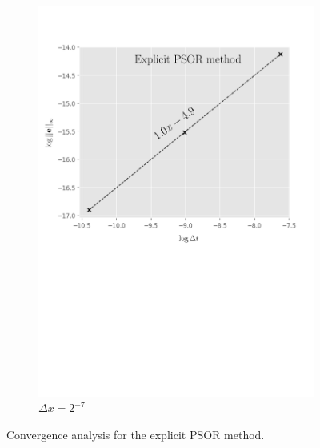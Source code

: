 \begin{figure}[H]
\begin{subfigure}{0.4\textwidth}
    \includegraphics[width=\textwidth]{chapters/chapter5/ConvergenceTimeExplicitLCP.pdf}
    \caption{$\Delta{t}=2^{-15},2^{-17},\dots,2^{-21}$}
    \caption*{$\Delta{x}=2^{-7}$}
    \label{fig:lcp:numericalresults:convergence_time_explicit}
  \end{subfigure}
  \caption{Convergence analysis for the explicit PSOR method.}
  \label{fig:lcp:numericalresults:company_convergence_analysis}
\end{figure}

